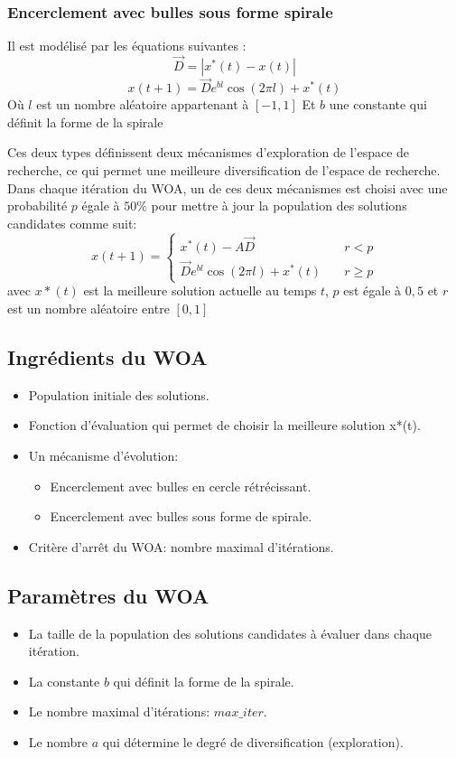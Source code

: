 \documentclass[12pt]{article}
\begin{document}
\subsubsection{Encerclement avec bulles sous forme spirale }
Il est modélisé par les équations suivantes :
\begin{equation}
    \vec{D} = |x^*(t) - x(t)|
\end{equation}
\begin{equation}
    x(t+1) = \vec{D} e^{bl} \cos (2\pi l) + x^*(t)
\end{equation}
Où \(l\) est un nombre aléatoire appartenant à \([-1,1]\) Et \(b\) une constante qui définit la forme de la spirale 

Ces deux types définissent deux mécanismes d’exploration de l’espace de recherche, ce qui permet une meilleure diversification de l’espace de recherche.
Dans chaque itération du WOA, un de ces deux mécanismes est choisi avec une probabilité \(p\) égale à \(50\%\) pour mettre à jour la population des solutions candidates comme suit:
\[ x(t+1) =
  \begin{cases}
    x^*(t) - A\vec{D}       & \quad r < p\\
    \vec{D} e^{bl} \cos (2\pi l) + x^*(t)  & \quad r \geq p
  \end{cases}
\]
avec \(x*(t)\) est la meilleure solution actuelle au temps \(t\), \(p\) est égale à \(0,5\) et \(r\) est un nombre aléatoire entre \([0, 1]\)

\subsection{Ingrédients du WOA }
\begin{itemize}
    \item Population initiale des solutions.
    \item Fonction d’évaluation qui permet de choisir la meilleure solution x*(t).
    \item Un mécanisme d'évolution:
    \begin{itemize}
        \item Encerclement avec bulles en cercle rétrécissant.
        \item Encerclement avec bulles sous forme de spirale.
    \end{itemize}
    \item Critère d'arrêt du WOA: nombre maximal d’itérations.    
\end{itemize}
\subsection{Paramètres du WOA }
\begin{itemize}
    \item La taille de la population des solutions candidates à évaluer dans chaque itération.
    \item La constante \(b\) qui définit la forme de la spirale.
    \item Le nombre maximal d’itérations: \(max\_iter\).
    \item Le nombre \(a\) qui détermine le degré de diversification (exploration).    
\end{itemize}
\end{document}
